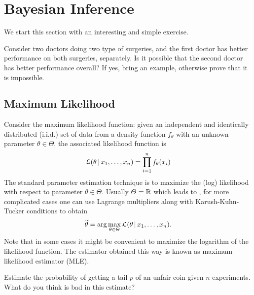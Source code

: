\section{Bayesian Inference}\label{5}
We start this section with an interesting and simple exercise. 

\begin{exmp} 
Consider two doctors doing two type of surgeries, and the first doctor has better performance on both surgeries, separately. Is it possible that the second doctor has better performance overall? If yes, bring an example, otherwise prove that it is impossible.
\end{exmp}

\subsection{Maximum Likelihood}
Consider the maximum likelihood function: given an independent and identically distributed (i.i.d.) set of data from a density function $f_{\theta}$ with an unknown parameter $\theta \in \Theta$, the associated likelihood function is 
\begin{align}\label{likelihood}
    \mathcal{L}(\theta \, | \, x_1, \dots, x_n) = \prod_{i=1}^n f_{\theta}(x_i)
\end{align}
The standard parameter estimation technique is to maximize the (log) likelihood with respect to parameter $\theta \in \Theta$. Usually $\varTheta = \mathbb{R}$ which leads to , for more complicated cases one can use Lagrange  multipliers along with Karush-Kuhn-Tucker conditions to obtain 
\begin{align}
    \widetilde{\theta} = \arg \max_{\theta \in \varTheta} \mathcal{L}(\theta \, | \, x_1, \dots, x_n).    
\end{align}
Note that in some cases it might be convenient to maximize the logarithm of the likelihood function. The estimator obtained this way is known as maximum likelihood estimator (MLE).

\begin{exer} 
Estimate the probability of getting a tail $p$ of an unfair coin given $n$ experiments. What do you think is bad in this estimate?
\end{exer}

